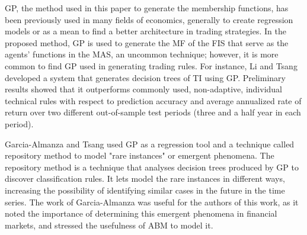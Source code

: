 \documentclass[a4paper,twoside]{article}
\begin{document}





GP, the method used in this paper to generate the membership
functions, has been previously used in many fields of
economics, generally to create regression models or as a
mean to find a better architecture in trading strategies. In the
proposed method, GP is used to generate the MF of the FIS that serve
as the agents' functions in the MAS, an uncommon technique; however,
it is more common to find GP used in generating trading rules. For
instance, Li and Tsang \cite{Li1999} developed a system that generates
decision trees of TI using GP. Preliminary results showed that it
outperforms commonly used, non-adaptive, individual technical rules
with respect to prediction accuracy and average annualized rate of
return over two different out-of-sample test periods (three and a half
year in each period). 

Garcia-Almanza and Tsang \cite{Garcia-Almanza2006} used GP as a
regression tool and a technique called repository method to model
"rare instances" or emergent phenomena. The repository method is a
technique that analyses decision trees produced by GP to discover
classification rules. It lets model the rare instances in different
ways, increasing the possibility of identifying similar cases in the
future in the time series. The work of Garcia-Almanza was useful for
the authors of this work, as it noted the importance of determining
this emergent phenomena in financial markets, and stressed the
usefulness of ABM to model it. 
\end{document}
